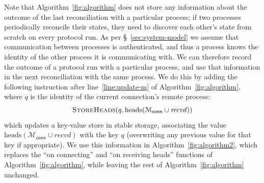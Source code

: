 \documentclass[a4paper,anonymous,USenglish]{lipics-v2019}
\begin{document}
Note that Algorithm~\ref{fig:algorithm} does not store any information about the outcome of the last reconciliation with a particular process; if two processes periodically reconcile their states, they need to discover each other's state from scratch on every protocol run.
As per \S~\ref{sec:system-model} we assume that communication between processes is authenticated, and thus a process knows the identity of the other process it is communicating with.
We can therefore record the outcome of a protocol run with a particular process, and use that information in the next reconciliation with the same process.
We do this by adding the following instruction after line~\ref{line:update-m} of Algorithm~\ref{fig:algorithm}, where $q$ is the identity of the current connection's remote process:
\[ \textsc{StoreHeads}(q, \mathrm{heads}(\mathcal{M}_\mathsf{conn} \cup \mathit{recvd})) \]
which updates a key-value store in stable storage, associating the value $\mathrm{heads}(\mathcal{M}_\mathsf{conn} \cup \mathit{recvd})$ with the key $q$ (overwriting any previous value for that key if appropriate).
We use this information in Algorithm~\ref{fig:algorithm2}, which replaces the ``on connecting'' and ``on receiving heads'' functions of Algorithm~\ref{fig:algorithm}, while leaving the rest of Algorithm~\ref{fig:algorithm} unchanged.
\end{document}

